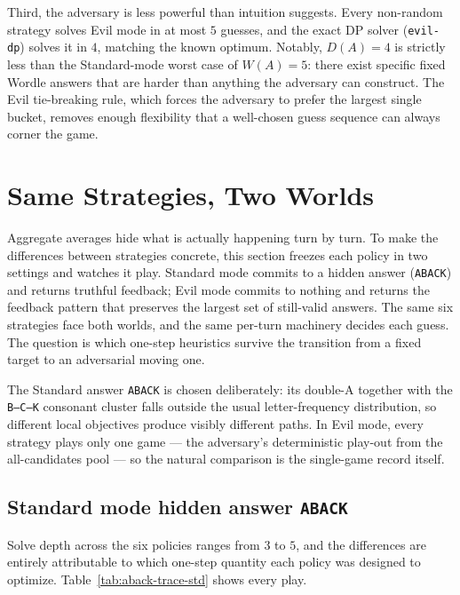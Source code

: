 \documentclass[11pt]{article}
\begin{document}
Third, the adversary is less powerful than intuition suggests. Every
non-random strategy solves Evil mode in at most $5$ guesses, and the
exact DP solver (\texttt{evil-dp}) solves it in $4$, matching the
known optimum. Notably, $D(A) = 4$ is strictly less than the
Standard-mode worst case of $W(A) = 5$: there exist specific fixed
Wordle answers that are harder than anything the adversary can
construct. The Evil tie-breaking rule, which forces the adversary to
prefer the largest single bucket, removes enough flexibility that a
well-chosen guess sequence can always corner the game.

\section*{Same Strategies, Two Worlds}

Aggregate averages hide what is actually happening turn by turn. To
make the differences between strategies concrete, this section freezes
each policy in two settings and watches it play. Standard mode commits
to a hidden answer (\texttt{ABACK}) and returns truthful feedback;
Evil mode commits to nothing and returns the feedback pattern that
preserves the largest set of still-valid answers. The same six
strategies face both worlds, and the same per-turn machinery decides
each guess. The question is which one-step heuristics survive the
transition from a fixed target to an adversarial moving one.

The Standard answer \texttt{ABACK} is chosen deliberately: its
double-A together with the \texttt{B--C--K} consonant cluster falls
outside the usual letter-frequency distribution, so different local
objectives produce visibly different paths. In Evil mode, every
strategy plays only one game --- the adversary's deterministic
play-out from the all-candidates pool --- so the natural comparison
is the single-game record itself.

\subsection*{Standard mode \textbullet{} hidden answer \texttt{ABACK}}

Solve depth across the six policies ranges from $3$ to $5$, and the
differences are entirely attributable to which one-step quantity each
policy was designed to optimize. Table~\ref{tab:aback-trace-std}
shows every play.
\end{document}
